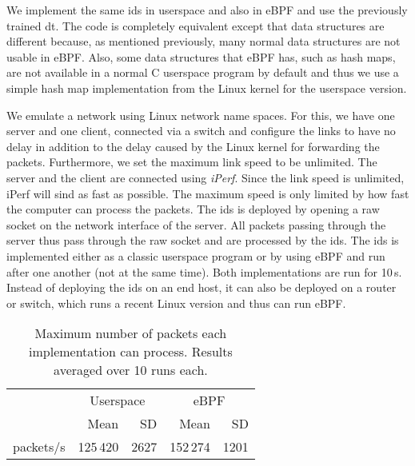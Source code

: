 \documentclass[conference]{IEEEtran}
\begin{document}
We implement the same \gls{ids} in userspace and also in eBPF and use the previously trained \gls{dt}. The code is completely equivalent except that data structures are different because, as mentioned previously, many normal data structures are not usable in eBPF. Also, some data structures that eBPF has, such as hash maps, are not available in a normal C userspace program by default and thus we use a simple hash map implementation from the Linux kernel for the userspace version. 

We emulate a network using Linux network name spaces. For this, we have one server and one client, connected via a switch and configure the links to have no delay in addition to the delay caused by the Linux kernel for forwarding the packets. Furthermore, we set the maximum link speed to be unlimited. The server and the client are connected using \textit{iPerf}. Since the link speed is unlimited, iPerf will sind as fast as possible. The maximum speed is only limited by how fast the computer can process the packets. The \gls{ids} is deployed by opening a raw socket on the network interface of the server. All packets passing through the server thus pass through the raw socket and are processed by the \gls{ids}. The \gls{ids} is implemented either as a classic userspace program or by using eBPF and run after one another (not at the same time). Both implementations are run for 10\,s. Instead of deploying the \gls{ids} on an end host, it can also be deployed on a router or switch, which runs a recent Linux version and thus can run eBPF. 

\begin{table}[h]
\caption{Maximum number of packets each implementation can process. Results averaged over 10 runs each.} \label{tab:comparison}
\centering
\begin{tabular}{rrrrr} \toprule
& \multicolumn{2}{c}{Userspace} & \multicolumn{2}{c}{eBPF} \\ 
& Mean & SD & Mean & SD \\\midrule
packets/s & 125\,420 & 2627 & 152\,274 & 1201 \\
\bottomrule
\end{tabular}
\end{table}

\end{document}
